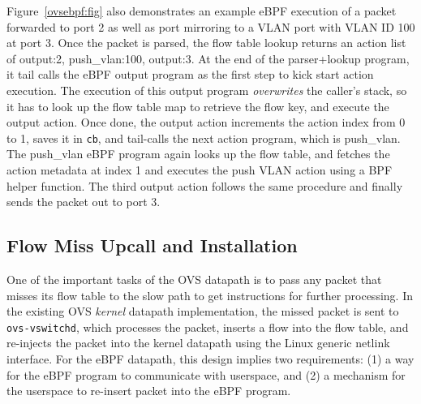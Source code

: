 \documentclass[10pt]{sigplanconf}
\newcommand{\saveforlater}[1]{}
\begin{document}
Figure~\ref{ovsebpf:fig} also demonstrates an example eBPF execution of a
packet forwarded to port 2 as well as port mirroring to a VLAN port with VLAN ID
100 at port 3.  Once the packet is parsed,
the flow table lookup returns an action list of output:2, push\_vlan:100,
output:3.  At the end of the parser+lookup program, it tail calls the eBPF
output program as the first step to kick start action execution.
The execution of this output program {\em overwrites} the caller's stack,
so it has to look up the flow table map to retrieve the flow key,
and execute the output action.  Once done, the output action increments the
action index from 0 to 1, saves it in \verb+cb+, and tail-calls the next action
program, which is push\_vlan.  The push\_vlan eBPF program again 
looks up the flow table, and fetches the action metadata at index 1
and executes the push VLAN action using a BPF helper function.
The third output action follows the same procedure and finally sends the
packet out to port 3.
\saveforlater{Appendix A shows the eBPF helper functions used in
each eBPF action program implementation.}

\subsection{Flow Miss Upcall and Installation}
One of the important tasks of the OVS datapath is to pass any packet that
misses its flow table to the slow path to get instructions for
further processing.  In the existing OVS {\em kernel} datapath implementation,
the missed packet is sent to \verb+ovs-vswitchd+, which processes the packet,
inserts a flow into the flow table, and re-injects the packet into the kernel
datapath using the Linux generic netlink interface.  For the eBPF datapath, this
design implies two requirements: (1) a way for the eBPF program to communicate
with userspace, and (2) a mechanism for the userspace to re-insert packet into
the eBPF program.
\end{document}
